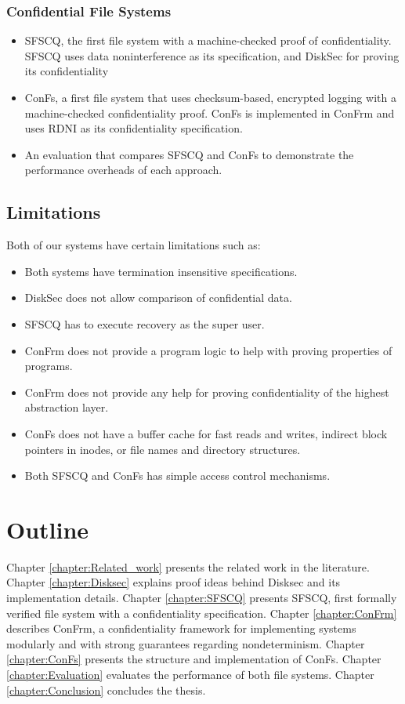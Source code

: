 \subsubsection*{Confidential File Systems}
\begin{itemize}
\item SFSCQ, the first file system with a machine-checked proof of
  confidentiality. SFSCQ uses data noninterference as its specification, 
  and DiskSec for proving its confidentiality

\item ConFs, a first file system that uses checksum-based, encrypted logging with a machine-checked confidentiality proof. ConFs is implemented in ConFrm and uses RDNI as its confidentiality specification.

\item An evaluation that compares SFSCQ and ConFs to demonstrate the performance overheads of each approach.
\end{itemize}

\subsection{Limitations}
Both of our systems have certain limitations such as:

\begin{itemize}
    \item Both systems have termination insensitive specifications.
    \item DiskSec does not allow comparison of confidential data.
    \item SFSCQ has to execute recovery as the super user.
    \item ConFrm does not provide a program logic to help with proving properties of programs.
    \item ConFrm does not provide any help for proving confidentiality of the highest abstraction layer.
    \item ConFs does not have a buffer cache for fast reads and writes, 
          indirect block pointers in inodes, or file names and directory structures.
    \item Both SFSCQ and ConFs has simple access control mechanisms.
\end{itemize}     

\section{Outline}
Chapter \ref{chapter:Related_work} presents the related work in the literature. Chapter \ref{chapter:Disksec} explains proof ideas behind Disksec and its implementation details. Chapter \ref{chapter:SFSCQ} presents SFSCQ, first formally verified file system with a confidentiality specification. Chapter \ref{chapter:ConFrm} describes ConFrm, a confidentiality framework for implementing systems modularly and with strong guarantees regarding nondeterminism. Chapter \ref{chapter:ConFs} presents the structure and implementation of ConFs. Chapter \ref{chapter:Evaluation} evaluates the performance of both file systems. Chapter \ref{chapter:Conclusion} concludes the thesis.



